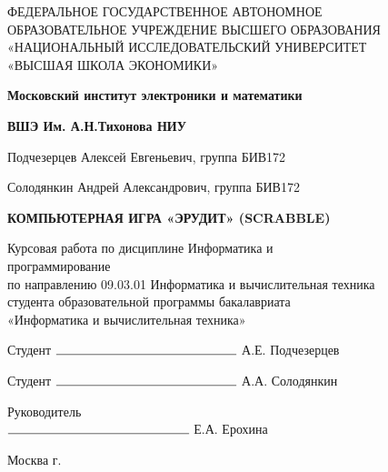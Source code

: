 \begin{titlepage}
	\begin{center}
		ФЕДЕРАЛЬНОЕ  ГОСУДАРСТВЕННОЕ АВТОНОМНОЕ \\
		ОБРАЗОВАТЕЛЬНОЕ УЧРЕЖДЕНИЕ ВЫСШЕГО ОБРАЗОВАНИЯ\\
		«НАЦИОНАЛЬНЫЙ ИССЛЕДОВАТЕЛЬСКИЙ УНИВЕРСИТЕТ\\
		«ВЫСШАЯ ШКОЛА ЭКОНОМИКИ»
	\end{center}
	
	\begin{center}
		\textbf{Московский институт электроники и математики}
		
		\textbf{ВШЭ Им. А.Н.Тихонова НИУ}
	\end{center}
	\vspace{1ex}	
	\begin{center}
		Подчезерцев Алексей Евгеньевич, группа БИВ172
		
		Солодянкин Андрей Александрович, группа БИВ172
	\end{center}	
	\vspace{1ex}
	\begin{center}
		\textbf{КОМПЬЮТЕРНАЯ ИГРА «ЭРУДИТ» (SCRABBLE)}
	\end{center}	
	\vspace{2ex}
	\begin{center}
		Курсовая работа по дисциплине Информатика и\\
		программирование\\
		по направлению 09.03.01 Информатика и вычислительная техника\\
		студента образовательной программы бакалавриата\\
		«Информатика и вычислительная техника»
	\end{center}
	\vspace{2ex}
	\begin{flushright}
		Студент $\rule{5cm}{0.15mm}$ А.Е. Подчезерцев 
		
		\vspace{1ex}
		Студент $\rule{5cm}{0.15mm}$ А.А. Солодянкин 
	\end{flushright}
	\vspace{3ex}
	\begin{flushright}
		Руководитель\\
		$\rule{5cm}{0.15mm}$ Е.А. Ерохина
	\end{flushright}
	\vfill
	\begin{center}
		Москва \the\year г.
	\end{center}
\end{titlepage}